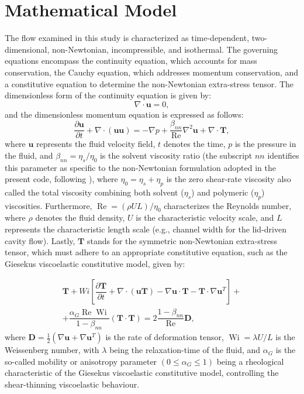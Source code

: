 \documentclass[preprint, 12pt]{elsarticle}
\begin{document}
\section{Mathematical Model}\label{sec_MathematicalModel}
\unskip
The flow examined in this study is characterized as time-dependent, two-dimensional, non-Newtonian, incompressible, and isothermal. The governing equations encompass the continuity equation, which accounts for mass conservation, the Cauchy equation, which addresses momentum conservation, and a constitutive equation to determine the non-Newtonian extra-stress tensor. The dimensionless form of the continuity equation is given by:
\begin{equation}
    \nabla\cdot\mathbf{u} = 0,\label{eq_conservation}
\end{equation}
and the dimensionless momentum equation is expressed as follows:
\begin{equation}
    \dfrac{\partial\mathbf{u}}{\partial t} + \nabla\cdot(\mathbf{uu}) = -\nabla p + \dfrac{\beta_{nn}}{\operatorname{Re}}\nabla^{2}\mathbf{u} + \nabla\cdot\mathbf{T},\label{eq_momentun}
\end{equation}
where $\mathbf{u}$ represents the fluid velocity field, $t$ denotes the time, $p$ is the pressure in the fluid, and $\beta_{nn} = \eta_{s}/\eta_{0}$ is the solvent viscosity ratio (the subscript $nn$ identifies this parameter as specific to the non-Newtonian formulation adopted in the present code, following \citealt{souza2003}), where $\eta_{0} = \eta_{s} + \eta_{p}$ is the zero shear-rate viscosity also called the total viscosity combining both solvent ($\eta_{s}$) and polymeric ($\eta_{p}$) viscosities. Furthermore, $\operatorname{Re} = (\rho U L)/\eta_{0}$ characterizes the Reynolds number, where $\rho$ denotes the fluid density, $U$ is the characteristic velocity scale, and $L$ represents the characteristic length scale (e.g., channel width for the lid-driven cavity flow). Lastly, $\mathbf{T}$ stands for the symmetric non-Newtonian extra-stress tensor, which must adhere to an appropriate constitutive equation, such as the Giesekus viscoelastic constitutive model, given by:

\begin{align}
    \mathbf{T} + Wi\left[ \dfrac{\partial\mathbf{T}}{\partial t} + \nabla\cdot(\mathbf{uT}) - \nabla\mathbf{u}\cdot\mathbf{T} - \mathbf{T}\cdot\nabla\mathbf{u}^{T} \right] 
    + \nonumber\\ + \dfrac{\alpha_{G}\operatorname{Re}\operatorname{Wi}}{1-\beta_{nn}}\left( \mathbf{T}\cdot\mathbf{T} \right) = 2\dfrac{1-\beta_{nn}}{\operatorname{Re}}\mathbf{D},\label{eq_geral_tensors}
\end{align}
where $\mathbf{D} = \frac{1}{2}\left( \nabla\mathbf{u} + \nabla\mathbf{u}^{T}  \right)$ is the rate of deformation tensor, $\operatorname{Wi} = \lambda U / L$ is the Weissenberg number, with $\lambda$ being the relaxation-time of the fluid, and $\alpha_{G}$ is the so-called mobility or anisotropy parameter $(0\leq \alpha_{G}\leq 1)$ being a rheological characteristic of the Giesekus viscoelastic constitutive model, controlling the shear-thinning viscoelastic behaviour.
\end{document}
